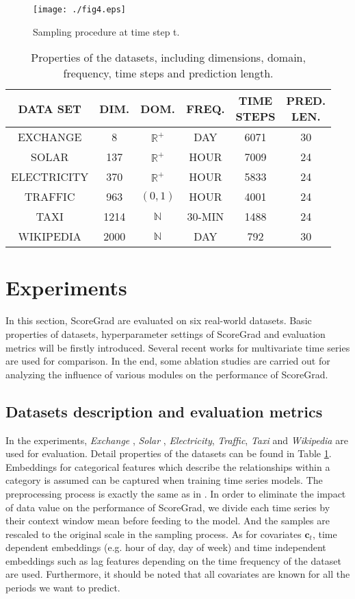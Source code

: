 \begin{figure}[t]
	\centering
	\texttt{[image: ./fig4.eps]} 
	\caption{Sampling procedure at time step t.}
	\label{Sampling}
\end{figure}

\begin{table}[!t]
	\caption{Properties of the datasets, including dimensions, domain, frequency, time steps and prediction length.}
	\label{table_2}
	\centering
	\begin{tabular}{cccccc}
		\hline
		DATA SET&DIM.&DOM.&FREQ.&\makecell[c]{TIME\\STEPS}&\makecell{PRED.\\ LEN.}\\
		\hline
		EXCHANGE&8&$\mathbb{R}^+$&DAY&6071&30\\
		SOLAR&137&$\mathbb{R}^+$&HOUR&7009&24\\
		ELECTRICITY&370&$\mathbb{R}^+$&HOUR&5833&24\\
		TRAFFIC&963&$(0,1)$&HOUR&4001&24\\
		TAXI&1214&$\mathbb{N}$&30-MIN&1488&24\\
		WIKIPEDIA&2000&$\mathbb{N}$&DAY&792&30\\
		\hline
	\end{tabular}
\end{table}

\section{Experiments}
In this section, ScoreGrad are evaluated on six real-world datasets. Basic properties of datasets, hyperparameter settings of ScoreGrad and evaluation metrics will be firstly introduced. Several recent works for multivariate time series are used for comparison. In the end, some ablation studies are carried out for analyzing the influence of various modules on the performance of ScoreGrad.

\subsection{Datasets description and evaluation metrics}
In the experiments, \textit{Exchange} \cite{lai2018modeling}, \textit{Solar} \cite{lai2018modeling}, \textit{Electricity}, \textit{Traffic}, \textit{Taxi} and \textit{Wikipedia} are used for evaluation. Detail properties of the datasets can be found in Table \ref{table_2}. Embeddings for categorical features which describe the relationships within a category is assumed can be captured when training time series models. The preprocessing process is exactly the same as in 
\cite{salinas2019high}. In order to eliminate the impact of data value on the performance of ScoreGrad, we divide each time series by their context window mean before feeding to the model. And the samples are rescaled to the original scale in the sampling process. As for covariates $\textbf{c}_t$, time dependent embeddings (e.g. hour of day, day of week) and time independent embeddings such as lag features depending on the time frequency of the dataset are used. Furthermore, it should be noted that all covariates are known for all the periods we want to predict.

